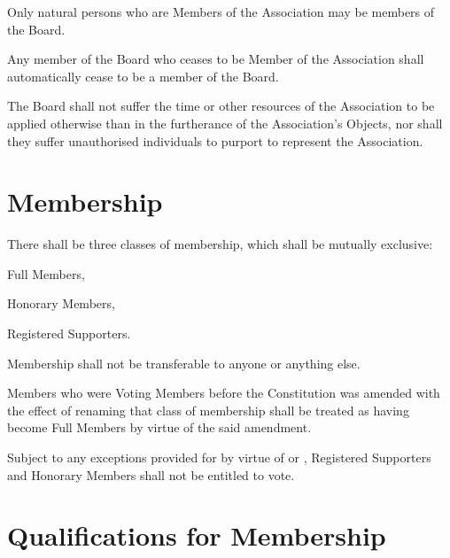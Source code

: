 \documentclass[10pt]{mk-articles-of-association}
\newcommand{\EC}[0]{Board}
\newcommand{\Exec}[0]{\EC{} }
\begin{document}
\begin{constenum}
  \item Only natural persons who are Members of the Association
    may be members of the \EC{}.

  \item Any member of the \Exec who ceases to be Member of the Association
    shall automatically cease to be a member of the \EC{}.

  \item The \Exec shall not suffer the time or other resources of
    the Association to be applied otherwise than in the furtherance of
    the Association's Objects, nor shall they suffer unauthorised individuals
    to purport to represent the Association.

\end{constenum}


\section{Membership}
  \begin{constenum}

  \item There shall be three classes of membership, which shall be mutually
    exclusive:
    \begin{constenum}
      \item Full Members,
      \item Honorary Members, \ITand
      \item Registered Supporters.
    \end{constenum}

  \item Membership shall not be transferable to anyone or anything else.

  \item Members who were Voting Members before the Constitution was
    amended with the effect of renaming that class of membership shall
    be treated as having become Full Members by virtue of the said
    amendment.

  \item Subject to any exceptions provided for by virtue of
     or ,
    Registered Supporters and
    Honorary Members shall not be entitled to vote.


\end{constenum}



\section{Qualifications for Membership}
\end{document}
